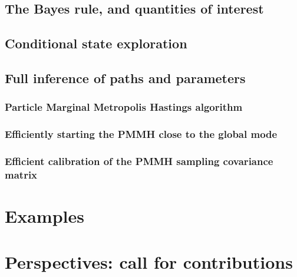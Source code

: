 \documentclass[a4paper,11pt]{article}
\begin{document}
\subsection{The Bayes rule, and quantities of interest}
\subsection{Conditional state exploration}
\subsection{Full inference of paths and parameters}
\subsubsection{Particle Marginal Metropolis Hastings algorithm}
\subsubsection{Efficiently starting the PMMH close to the global mode}
\subsubsection{Efficient calibration of the PMMH sampling covariance matrix}
\section{Examples}
\section{Perspectives: call for contributions}














 
\end{document}
